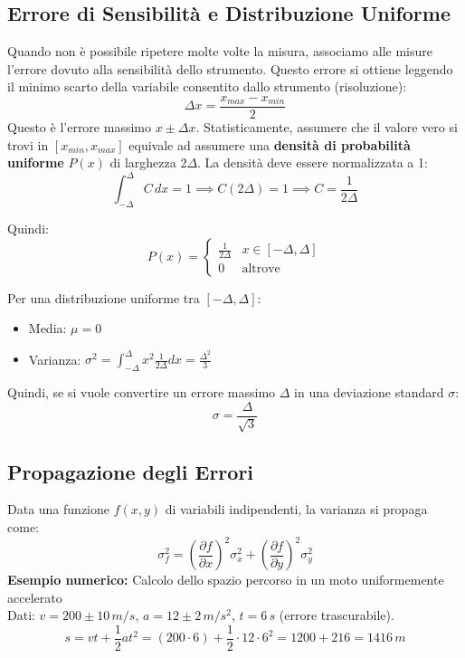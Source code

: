 \documentclass[a4paper,11pt]{article}
\theoremstyle{remark}
\begin{document}
\subsection{Errore di Sensibilità e Distribuzione Uniforme}
Quando non è possibile ripetere molte volte la misura, associamo alle misure l'errore dovuto alla sensibilità dello strumento. Questo errore si ottiene leggendo il minimo scarto della variabile consentito dallo strumento (risoluzione):
\[ \Delta x = \frac{x_{max} - x_{min}}{2} \]
Questo è l'errore massimo $x \pm \Delta x$. Statisticamente, assumere che il valore vero si trovi in $[x_{min}, x_{max}]$ equivale ad assumere una \textbf{densità di probabilità uniforme} $P(x)$ di larghezza $2\Delta$.
La densità deve essere normalizzata a 1:
\[ \int_{-\Delta}^{\Delta} C \, dx = 1 \implies C(2\Delta) = 1 \implies C = \frac{1}{2\Delta} \]

Quindi:
\[ P(x) = \begin{cases} \frac{1}{2\Delta} & x \in [-\Delta, \Delta] \\ 0 & \text{altrove} \end{cases} \]

Per una distribuzione uniforme tra $[-\Delta, \Delta]$:
\begin{itemize}
    \item Media: $\mu = 0$
    \item Varianza: $\sigma^2 = \int_{-\Delta}^{\Delta} x^2 \frac{1}{2\Delta} dx = \frac{\Delta^2}{3}$
\end{itemize}
Quindi, se si vuole convertire un errore massimo $\Delta$ in una deviazione standard $\sigma$:
\begin{equation}
    \sigma = \frac{\Delta}{\sqrt{3}}
\end{equation}

\subsection{Propagazione degli Errori}
Data una funzione $f(x,y)$ di variabili indipendenti, la varianza si propaga come:
\begin{equation}
    \sigma_f^2 = \left( \frac{\partial f}{\partial x} \right)^2 \sigma_x^2 + \left( \frac{\partial f}{\partial y} \right)^2 \sigma_y^2
\end{equation}
\textbf{Esempio numerico:}
Calcolo dello spazio percorso in un moto uniformemente accelerato \\
Dati: $v = 200 \pm 10 \, m/s$, \quad $a = 12 \pm 2 \, m/s^2$, \quad $t = 6 \, s$ (errore trascurabile).
\[ s =  vt + \frac{1}{2}at^2 = (200 \cdot 6) + \frac{1}{2} \cdot 12 \cdot 6^2 = 1200 + 216 = 1416 \, m \]
\end{document}
